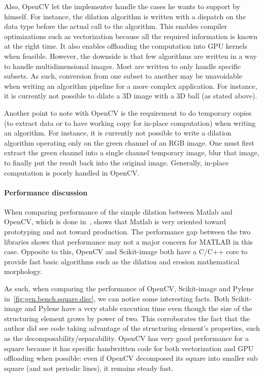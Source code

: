 Also, OpenCV let the implementer handle the cases he wants to support by himself. For instance, the dilation algorithm
is written with a dispatch on the data type before the actual call to the algorithm. This enables compiler optimizations
such as vectorization because all the required information is known at the right time. It also enables offloading the
computation into GPU kernels when feasible. However, the downside is that few algorithms are written in a way to handle
multidimensional images. Most are written to only handle specific subsets. As such, conversion from one subset to
another may be unavoidable when writing an algorithm pipeline for a more complex application. For instance, it is
currently not possible to dilate a 3D image with a 3D ball (as stated above).

Another point to note with OpenCV is the requirement to do temporary copies (to extract data or to have working copy for
in-place computation) when writing an algorithm. For instance, it is currently not possible to write a dilation
algorithm operating only on the green channel of an RGB image. One must first extract the green channel into a single
channel temporary image, blur that image, to finally put the result back into the original image. Generally, in-place
computation is poorly handled in OpenCV.

\paragraph{Performance discussion} When comparing performance of the simple dilation between Matlab and OpenCV, which
is done in~\parencite{matuska.2012.bench}, shows that Matlab is very oriented toward prototyping and not toward production.
The performance gap between the two libraries shows that performance may not a major concern for MATLAB in this case.
Opposite to this, OpenCV and Scikit-image both have a C/C++ core to provide fast basic algorithms such as the dilation
and erosion mathematical morphology.

As such, when comparing the performance of OpenCV, Scikit-image and Pylene in~\cref{fig:gen.bench.square.disc}, we can
notice some interesting facts. Both Scikit-image and Pylene have a very stable execution time even though the size of
the structuring element grows by power of two. This corroborates the fact that the author did see code taking advantage
of the structuring element's properties, such as the decomposability/separability. OpenCV has very good performance for
a square because it has specific handwritten code for both vectorization and GPU offloading when possible: even if
OpenCV decomposed its square into smaller sub square (and not periodic lines), it remains steady fast.

